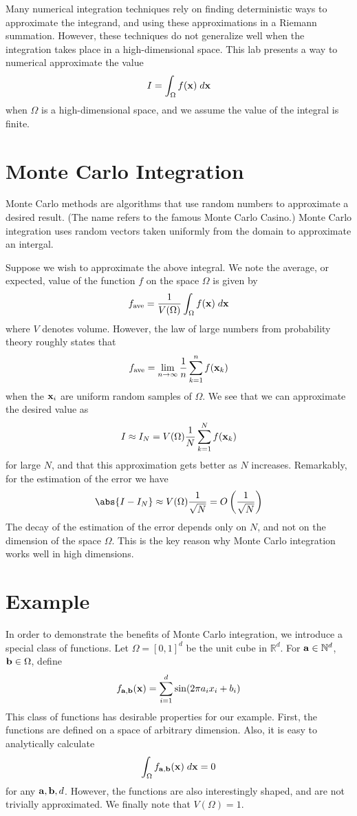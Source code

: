 \newcommand{\fab}{f_{{\bf a},{\bf b}}}


Many numerical integration techniques rely on finding deterministic ways to
approximate the integrand, and using these approximations in a Riemann
summation. However, these techniques do not generalize well when the integration
takes place in a high-dimensional space. This lab presents a way to numerical
approximate the value
\[I = \int_{\Omega} f({\bf x}) \;d{\bf x} \]
when $\Omega$ is a high-dimensional space, and we assume the value of the
integral is finite.

\section*{Monte Carlo Integration}
Monte Carlo methods are algorithms that use random numbers to approximate a
desired result. (The name refers to the famous Monte Carlo Casino.) Monte Carlo
integration uses random vectors taken uniformly from the domain to approximate
an intergal.

Suppose we wish to approximate the above integral. We note the average, or
expected, value of the function $f$ on the space $\Omega$ is given by
\[f_{\text{ave}} = \frac{1}{V(\Omega)}\int_{\Omega} f({\bf x}) \;d{\bf x} \]
where $V$ denotes volume. However, the law of large numbers from probability
theory roughly states that
\[f_{\text{ave}} = \lim_{n \to \infty} \frac{1}{n} \sum_{k=1}^{n} f({\bf x}_k) \]
when the ${\bf x}_i$ are uniform random samples of $\Omega$. We see that we can
approximate the desired value as
\[I \approx I_N = V(\Omega)\frac{1}{N}\sum_{k=1}^{N} f({\bf x}_k) \]
for large $N$, and that this approximation gets better as $N$ increases.
Remarkably, for the estimation of the error we have
\[\abs{I - I_N} \approx V(\Omega)\frac{1}{\sqrt{N}} =
O\left(\frac{1}{\sqrt{N}}\right) \] 
The decay of the estimation of the error depends only on $N$, and not on the
dimension of the space $\Omega$. This is the key reason why Monte Carlo
integration works well in high dimensions.

\section*{Example}

In order to demonstrate the benefits of Monte Carlo integration, we introduce a
special class of functions. Let $\Omega = [0,1]^d$ be the unit cube in
$\mathbb{R}^d$. For ${\bf a} \in \mathbb{N}^d$, ${\bf b} \in \Omega$, define
\[\fab({\bf x}) = \sum_{i=1}^{d} \sin(2\pi a_i x_i + b_i) \]
This class of functions has desirable properties for our example. First, the
functions are defined on a space of arbitrary dimension. Also, it is easy
to analytically calculate
\[\int_{\Omega} \fab({\bf x}) \; d {\bf x} = 0 \]
for any ${\bf a}, {\bf b}, d$. However, the functions are also interestingly
shaped, and are not trivially approximated. We finally note that $V(\Omega) = 1$.


